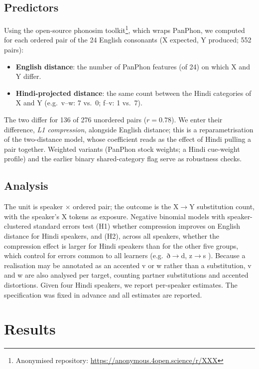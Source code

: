 \documentclass[a4paper,11pt,twocolumn]{article}
\newcommand{\ipa}[1]{{\ipafont #1}}
\begin{document}
\subsection{Predictors}

Using the open-source phonosim toolkit\footnote{Anonymised repository: \url{https://anonymous.4open.science/r/XXX}}, which wraps PanPhon, we computed for each ordered pair of the 24 English consonants (X expected, Y produced; 552 pairs):

\begin{itemize}
\item \textbf{English distance}: the number of PanPhon features (of 24) on which X and Y differ.
\item \textbf{Hindi-projected distance}: the same count between the Hindi categories of X and Y (e.g.\ \ipa{v}--\ipa{w}: 7 vs.\ 0; \ipa{f}--\ipa{v}: 1 vs.\ 7).
\end{itemize}

The two differ for 136 of 276 unordered pairs ($r = 0.78$). We enter their difference, \emph{L1 compression}, alongside English distance; this is a reparametrisation of the two-distance model, whose coefficient reads as the effect of Hindi pulling a pair together. Weighted variants (PanPhon stock weights; a Hindi cue-weight profile) and the earlier binary shared-category flag serve as robustness checks.

\subsection{Analysis}

The unit is speaker $\times$ ordered pair; the outcome is the X$\to$Y substitution count, with the speaker's X tokens as exposure. Negative binomial models with speaker-clustered standard errors test (H1) whether compression improves on English distance for Hindi speakers, and (H2), across all speakers, whether the compression effect is larger for Hindi speakers than for the other five groups, which control for errors common to all learners (e.g.\ \ipa{ð}$\to$\ipa{d}, \ipa{z}$\to$\ipa{s} \cite{Zhao:2018}). Because a \ipa{[ʋ]} realisation may be annotated as an accented \ipa{v} or \ipa{w} rather than a substitution, \ipa{v} and \ipa{w} are also analysed per target, counting partner substitutions and accented distortions. Given four Hindi speakers, we report per-speaker estimates. The specification was fixed in advance and all estimates are reported.

\section{Results}
\end{document}
